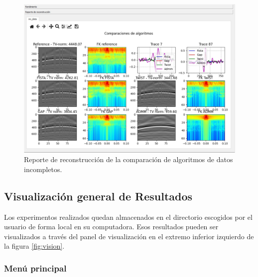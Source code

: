 \documentclass[12pt,twoside,letter]{ol-softwaremanual}
\newcommand*\circled[1]{\tikz[baseline=(char.base)]{
            \node[shape=circle,draw,inner sep=2pt] (char) {#1};}}
\begin{document}
\begin{figure}[h]
	\centering
	\includegraphics[width=0.7\linewidth]{figures/ajusteincb}
	\caption{Reporte de reconstrucción de la comparación de algoritmos de datos incompletos.}
	\label{fig:ajusteincb}
\end{figure}

\newpage

\subsection{Visualización general de Resultados}

Los experimentos realizados quedan almacenados en el directorio escogidos por el usuario de forma local en su computadora. Esos resultados pueden ser visualizados a través del panel de visualización \circled{6} en el extremo inferior izquierdo de la figura \ref{fig:vision}.

\subsubsection{Menú principal}
\end{document}
